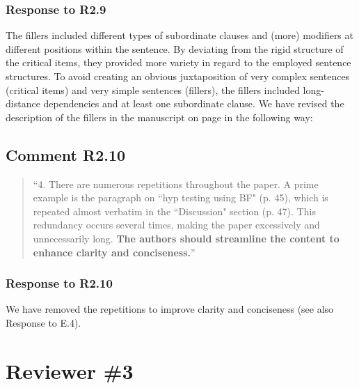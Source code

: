 \documentclass[12pt]{article}
\begin{document}
\subsubsection*{Response to R2.9}
The fillers included different types of subordinate clauses and (more) modifiers at different positions within the sentence. By deviating from the rigid structure of the critical items, they provided more variety in regard to the employed sentence structures. To avoid creating an obvious juxtaposition of very complex sentences (critical items) and very simple sentences (fillers), the fillers included long-distance dependencies and at least one subordinate clause. We have revised the description of the fillers in the manuscript on page \pageref{fillers} in the following way:

\begin{quote}
\end{quote}
 
\subsection*{Comment R2.10}
\begin{quote}
``4. There are numerous repetitions throughout the paper. A prime example is the paragraph on ``hyp testing using BF" (p. 45), which is repeated almost verbatim in the ``Discussion" section (p. 47). This redundancy occurs several times, making the paper excessively and unnecessarily long. \textbf{The authors should streamline the content to enhance clarity and conciseness.}''
\end{quote}

\subsubsection*{Response to R2.10}
We have removed the repetitions to improve clarity and conciseness (see also Response to E.4).

\section*{Reviewer \#3} 
\end{document}
